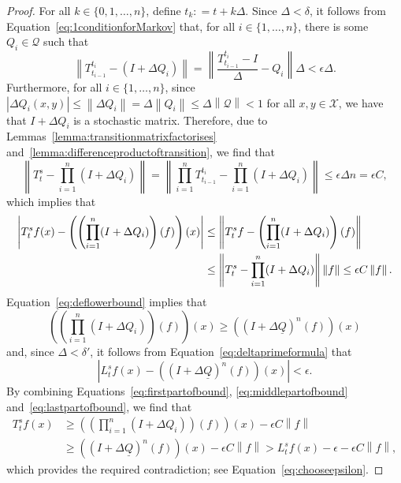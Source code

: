 \documentclass[10pt]{paper}
\newcommand{\states}{\mathcal{X}}
\newcommand{\lbound}{L}
\newcommand{\rateset}{\mathcal{Q}}
\newcommand{\lrate}{\underline{Q}}
\newcommand{\norm}[1]{\left\lVert #1 \right\rVert}
\newcommand{\abs}[1]{\left\vert #1 \right\vert}
\newcommand{\coloneqq}{:\!=}
\begin{document}
\begin{proof}
For all $k\in\{0,1,\dots,n\}$, define $t_k\coloneqq t+k\Delta$. Since $\Delta<\delta$, it follows from Equation~\eqref{eq:1conditionforMarkov} that, for all $i\in\{1,\dots,n\}$, there is some $Q_i\in\rateset$ such that 
\begin{equation*}
\norm{T_{t_{i-1}}^{t_i}-(I+\Delta Q_i)}
=\norm{\frac{T_{t_{i-1}}^{t_i}-I}{\Delta}-Q_i}\Delta
<\epsilon\Delta.
\end{equation*}
Furthermore, for all $i\in\{1,\dots,n\}$, since $\abs{\Delta Q_i(x,y)}\leq\norm{\Delta Q_i}=\Delta\norm{Q_i}\leq\Delta\norm{\rateset}<1$ for all $x,y\in\states$, we have that $I+\Delta Q_i$ is a stochastic matrix.
Therefore, due to Lemmas~\ref{lemma:transitionmatrixfactorises} and~\ref{lemma:differenceproductoftransition}, we find that
\begin{equation*}
\norm{T_t^s-\prod_{i=1}^n(I+\Delta Q_i)}
=\norm{\prod_{i=1}^n T_{t_{i-1}}^{t_i}-\prod_{i=1}^n(I+\Delta Q_i)}
\leq\epsilon\Delta n=\epsilon C,
\end{equation*}
which implies that
\begin{align}
\abs{T_t^sf(x)-\left(\left(\prod_{i=1}^n(I+\Delta Q_i)\right)(f)\right)(x)}
&\leq
\norm{T_t^sf-\left(\prod_{i=1}^n(I+\Delta Q_i)\right)(f)}\notag\\
&\leq
\norm{T_t^s-\prod_{i=1}^n(I+\Delta Q_i)}\norm{f}
\leq\epsilon C\norm{f}.\label{eq:firstpartofbound}
\end{align}
\noindent
Equation~\eqref{eq:deflowerbound} implies that
\begin{equation}
\left(\left(\prod_{i=1}^n(I+\Delta Q_i)\right)(f)\right)(x)
\geq
\left((I+\Delta\lrate)^n(f)\right)(x)\label{eq:middlepartofbound}
\end{equation}
and, since $\Delta<\delta'$, it follows from Equation~\eqref{eq:deltaprimeformula} that
\begin{equation}\label{eq:lastpartofbound}
\abs{\lbound_t^sf(x) - \left((I+\Delta\lrate)^n(f)\right)(x)}<\epsilon.
\end{equation}
\noindent
By combining Equations~\eqref{eq:firstpartofbound}, \eqref{eq:middlepartofbound} and~\eqref{eq:lastpartofbound}, we find that
\begin{align*}
T_t^sf(x)
&\geq
\left(\left(\prod_{i=1}^n(I+\Delta Q_i)\right)(f)\right)(x)-\epsilon C\norm{f}\\
&\geq
\left((I+\Delta\lrate)^n(f)\right)(x)-\epsilon C\norm{f}
>\lbound_t^sf(x)-\epsilon-\epsilon C\norm{f},
\end{align*}
which provides the required contradiction; see Equation~\eqref{eq:chooseepsilon}.
\end{proof}
\end{document}
